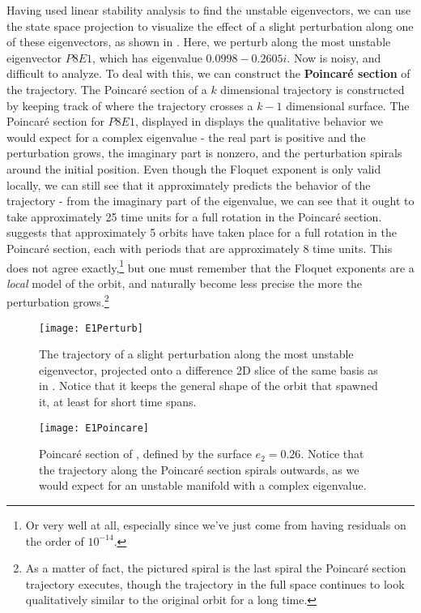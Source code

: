 Having used linear stability analysis to find the unstable eigenvectors, we can use the state space projection to visualize the effect of a slight perturbation along one of these eigenvectors, as shown in . Here, we perturb along the most unstable eigenvector $P8E1$, which has eigenvalue $0.0998 - 0.2605 i$. Now  is noisy, and difficult to analyze. To deal with this, we can construct the {\bf Poincar\'e section} of the trajectory. The Poincar\'e section of a $k$ dimensional trajectory is constructed by keeping track of where the trajectory crosses a $k-1$ dimensional surface. The Poincar\'e section for  $P8E1$, displayed in  displays the qualitative behavior we would expect for a complex eigenvalue - the real part is positive and the perturbation grows, the imaginary part is nonzero, and the perturbation spirals around the initial position. Even though the Floquet exponent is only valid locally, we can still see that it approximately predicts the behavior of the trajectory - from the imaginary part of the eigenvalue, we can see that it ought to take approximately 25 time units for a full rotation in the Poincar\'e section.  suggests that approximately 5 orbits have taken place for a full rotation in the Poincar\'e section, each with periods that are approximately 8 time units. This does not agree exactly,\footnote{Or very well at all, especially since we've just come from having residuals on the order of $10^{-14}$.} but one must remember that the Floquet exponents are a \emph{local} model of the orbit, and naturally become less precise the more the perturbation grows.\footnote{As a matter of fact, the pictured spiral is the last spiral the Poincar\'e section trajectory executes, though the trajectory in the full space continues to look qualitatively similar to the original orbit for a long time.}   


\begin{figure}[h!]
\centerline{\texttt{[image: E1Perturb]}}
\caption{The trajectory of a slight perturbation along the most unstable eigenvector, projected onto a difference 2D slice of the same basis as in . Notice that it keeps the general shape of the orbit that spawned it, at least for short time spans.}\label{fig:p8E1}
\end{figure}

\begin{figure}[h!]
\centerline{\texttt{[image: E1Poincare]}}
\caption{Poincar\'e section of , defined by the surface $e_2 = 0.26$. Notice that the trajectory along the Poincar\'e section spirals outwards, as we would expect for an unstable manifold with a complex eigenvalue.}\label{fig:E1Poincare}
\end{figure}

